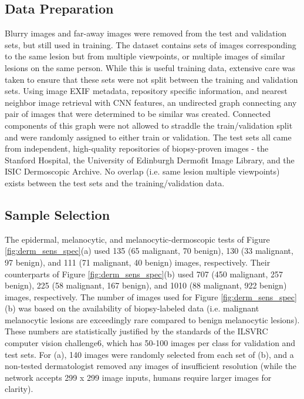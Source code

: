 \subsection{Data Preparation}
Blurry images and far-away images were removed from the test and validation sets, but still used in training. The dataset contains sets of images corresponding to the same lesion but from multiple viewpoints, or multiple images of similar lesions on the same person. While this is useful training data, extensive care was taken to ensure that these sets were not split between the training and validation sets. Using image EXIF metadata, repository specific information, and nearest neighbor image retrieval with CNN features, an undirected graph connecting any pair of images that were determined to be similar was created. Connected components of this graph were not allowed to straddle the train/validation split and were randomly assigned to either train or validation. The test sets all came from independent, high-quality repositories of biopsy-proven images - the Stanford Hospital, the University of Edinburgh Dermofit Image Library, and the ISIC Dermoscopic Archive. No overlap (i.e. same lesion multiple viewpoints) exists between the test sets and the training/validation data.

\subsection{Sample Selection}
The epidermal, melanocytic, and melanocytic-dermoscopic tests of Figure \ref{fig:derm_sens_spec}(a) used 135 (65 malignant, 70 benign), 130 (33 malignant, 97 benign), and 111 (71 malignant, 40 benign) images, respectively. Their counterparts of Figure \ref{fig:derm_sens_spec}(b) used 707 (450 malignant, 257 benign), 225 (58 malignant, 167 benign), and 1010 (88 malignant, 922 benign) images, respectively. The number of images used for Figure \ref{fig:derm_sens_spec}(b) was based on the availability of biopsy-labeled data (i.e. malignant melanocytic lesions are exceedingly rare compared to benign melanocytic lesions). These numbers are statistically justified by the standards of the ILSVRC computer vision challenge6, which has 50-100 images per class for validation and test sets. For (a), 140 images were randomly selected from each set of (b), and a non-tested dermatologist removed any images of insufficient resolution (while the network accepts 299 x 299 image inputs, humans require larger images for clarity).

